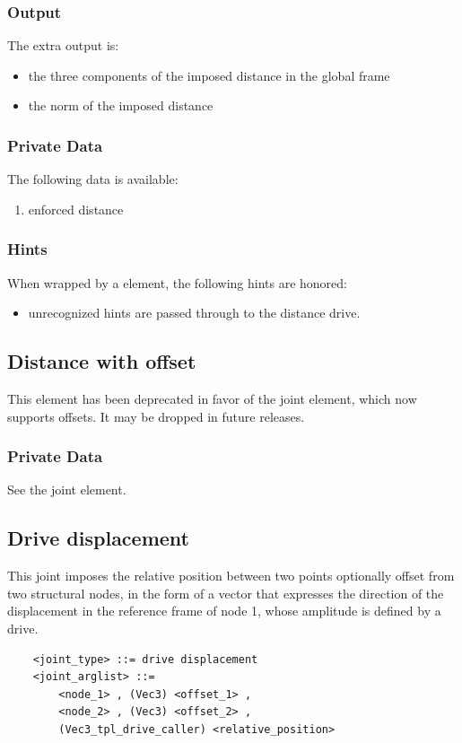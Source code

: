 \subsubsection{Output}
The extra output is:
\begin{itemize}
    \item the three components of the imposed distance in the global frame
    \item the norm of the imposed distance
\end{itemize}

\subsubsection{Private Data}
The following data is available:
\begin{enumerate}
\item {} enforced distance
\end{enumerate}

\subsubsection{Hints}
When wrapped by a  element, the following hints are honored:
\begin{itemize}
\item unrecognized hints are passed through to the distance drive.
\end{itemize}



\subsection{Distance with offset}
This element has been deprecated in favor of the 
joint element, which now supports offsets.
It may be dropped in future releases.

\subsubsection{Private Data}
See the  joint element.



\subsection{Drive displacement}
\label{sec:EL:JOINT:DRIVEDISPLACEMENT}
This joint imposes the relative position between two points 
optionally offset from two structural nodes,
in the form of a vector that expresses the direction of the displacement
in the reference frame of node 1, whose amplitude is defined by a drive.
\begin{verbatim}
    <joint_type> ::= drive displacement
    <joint_arglist> ::= 
        <node_1> , (Vec3) <offset_1> ,
        <node_2> , (Vec3) <offset_2> ,
        (Vec3_tpl_drive_caller) <relative_position>
\end{verbatim}

